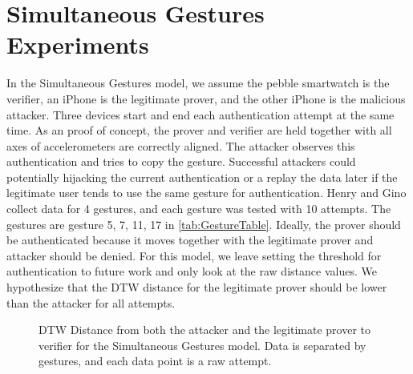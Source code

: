 


\section{Simultaneous Gestures \\ Experiments}
\label{sec:Simultaneous}
In the Simultaneous Gestures model, we assume the pebble smartwatch is the verifier, an iPhone is the legitimate prover, and the other iPhone is the malicious attacker. Three devices start and end each authentication attempt at the same time. As an proof of concept, the prover and verifier are held together with all axes of accelerometers are correctly aligned. The attacker observes this authentication and tries to copy the gesture. Successful attackers could potentially hijacking the current authentication or a replay the data later if the legitimate user tends to use the same gesture for authentication. Henry and Gino collect data for 4 gestures, and each gesture was tested with 10 attempts. The gestures are gesture 5, 7, 11, 17 in \autoref{tab:GestureTable}. Ideally, the prover should be authenticated because it moves together with the legitimate prover and attacker should be denied. For this model, we leave setting the threshold for authentication to future work and only look at the raw distance values. We hypothesize that the \gls{DTW} distance for the legitimate prover should be lower than the attacker for all attempts.

 \begin{figure*}[!t]
    	\centering
 	\subfloat[Gesture \#5 ]{
 	\centering
 	\tikzquarter
		
 		 \label{fig:s5}}
 	\subfloat[Gesture \#7]{
 	\centering
 	\tikzquarter
		
 		 \label{fig:s7}}
 	\subfloat[Gesture \#11]{
 	\centering
 	\tikzquarter
		
 		 \label{fig:s11}}
	\subfloat[Gesture \#17]{
 	\centering
 	\tikzquarter
		
 		 \label{fig:s17}}
 	\caption{DTW Distance from both the attacker and the legitimate prover to verifier for the Simultaneous Gestures model. Data is separated by gestures, and each data point is a raw attempt.}
 	\label{fig:SimultaneousDistanceMatrixPlot}
 \end{figure*}

